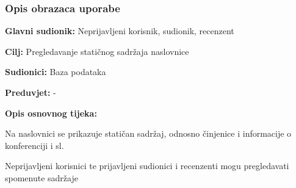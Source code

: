				\subsubsection{Opis obrazaca uporabe}
					
					\noindent {}
					\begin{packed_item}
	
						\item \textbf{Glavni sudionik: } Neprijavljeni korisnik, sudionik, recenzent
						\item  \textbf{Cilj:} Pregledavanje statičnog sadržaja naslovnice
						\item  \textbf{Sudionici:} Baza podataka
						\item  \textbf{Preduvjet:} -
						\item  \textbf{Opis osnovnog tijeka:}
						
						\item[] \begin{packed_enum}
	
							\item Na naslovnici se prikazuje statičan sadržaj, odnosno činjenice i informacije o konferenciji i sl.
							\item Neprijavljeni korisnici te prijavljeni sudionici i recenzenti mogu pregledavati spomenute sadržaje
						\end{packed_enum}
						

					\end{packed_item}

